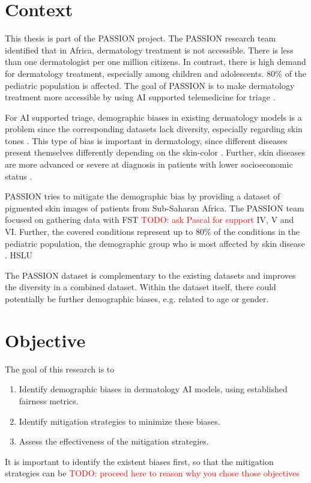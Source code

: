 \documentclass[12pt, a4paper, oneside]{book}   	%
\renewcommand{\todo}[1]{\textcolor{red}{TODO: #1}}
\begin{document}
	
		\section{Context}
			This thesis is part of the PASSION project. The PASSION research team identified that in Africa, dermatology treatment is not accessible. There is less than one dermatologist per one million citizens. In contrast, there is high demand for dermatology treatment, especially among children and adolescents. 80\% of the \gls{pediatric} population is affected. The goal of PASSION is to make dermatology treatment more accessible by using AI supported telemedicine for triage \autocite{Gottfrois2024}.
			
			For AI supported triage, demographic biases in existing dermatology models is a problem since the corresponding datasets lack diversity, especially regarding skin tones \autocite{Gottfrois2024}. This type of bias is important in dermatology, since different diseases present themselves differently depending on the skin-color \autocite{Diaz2022}. Further, skin diseases are more advanced or severe at diagnosis in patients with lower socioeconomic status \autocite{BAD2021}.
			
			PASSION tries to mitigate the demographic bias by providing a dataset of pigmented skin images of patients from Sub-Saharan Africa. The PASSION team focused on gathering data with \gls{FST} \todo{ask Pascal for support} IV, V and VI. Further, the covered conditions represent up to 80\% of the conditions in the \gls{pediatric} population, the demographic group who is most affected by skin disease \autocite{Gottfrois2024}. \gls{HSLU}
			
			The PASSION dataset is complementary to the existing datasets and improves the diversity in a combined dataset. Within the dataset itself, there could potentially be further demographic biases, e.g. related to age or gender.
	
		\section{Objective}
			The goal of this research is to
			\begin{enumerate}
				\item Identify demographic biases in dermatology AI models, using established fairness metrics.
				\item Identify mitigation strategies to minimize these biases.
				\item Assess the effectiveness of the mitigation strategies.
			\end{enumerate}
			It is important to identify the existent biases first, so that the mitigation strategies can be \todo{proceed here to reason why you chose those objectives}
	
\end{document}
